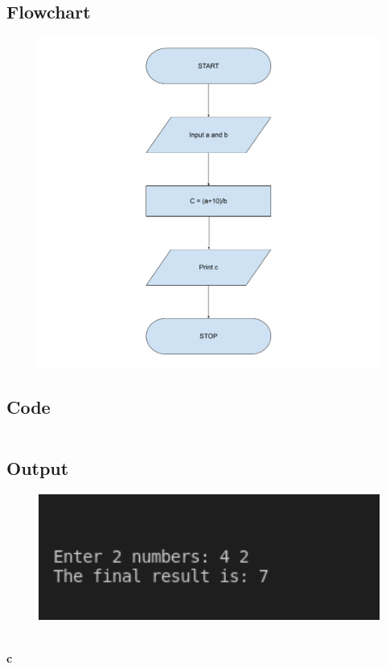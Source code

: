 \documentclass[12pt]{article}
\begin{document}
\subsection{Flowchart}
\begin{figure}[h]
    \centering
    \includegraphics[width=1.0\textwidth]{Flowchart04b.png}
\end{figure}
\newpage
\subsection{Code}
\inputminted{c}{q4b.c}
\subsection{Output}
\begin{figure}[h]
    \centering
    \includegraphics[width=1.0\textwidth]{4b.png}
\end{figure}\\ \newline
\newpage
\textbf{c}
\end{document}
